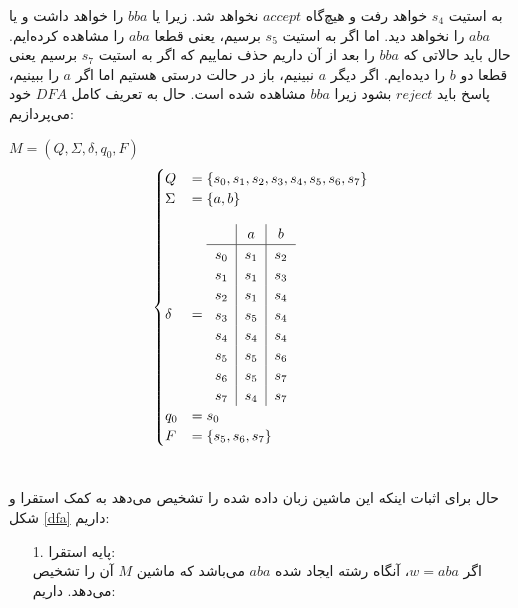 \begin{enumerate}
به استیت $s_4$ خواهد رفت و هیچ‌گاه $accept$ نخواهد شد.
زیرا یا $bba$ را خواهد داشت و یا $aba$ را نخواهد دید. اما اگر به استیت 
$s_5$ برسیم، یعنی قطعا 
$aba$ را مشاهده کرده‌ایم. حال باید حالاتی که $bba$ را بعد از آن داریم حذف نماییم که اگر به استیت $s_7$ برسیم یعنی قطعا دو $b$ را دیده‌ایم. اگر دیگر $a$ نبینیم، باز در حالت درستی هستیم اما اگر $a$ را ببینیم، پاسخ باید $reject$ بشود زیرا $bba$ مشاهده شده است.
حال به تعریف کامل $DFA$ خود می‌پردازیم:\\[0.1in]
\begin{center}
    $M = (Q, \Sigma, \delta, q_0, F)$
    \begin{equation*}
    \begin{cases}
        Q &= \{ s_0, s_1, s_2, s_3, s_4, s_5, s_6, s_7\} \\
        \Sigma &= \{ a, b\} \\[0.15in]
        \delta &=
        \begin{tabular}{c|c|c}
         & $a$ & $b$ \\ \hline
        $s_0$ & $s_1$ &$s_2$\\
        $s_1$ & $s_1$ &$s_3$\\
        $s_2$ & $s_1$ &$s_4$\\
        $s_3$ & $s_5$ &$s_4$\\
        $s_4$ & $s_4$ &$s_4$\\
        $s_5$ & $s_5$ &$s_6$\\
        $s_6$ & $s_5$ &$s_7$\\
        $s_7$ & $s_4$ &$s_7$\\
        \end{tabular}\\[0.1in]
        q_0 &= s_0\\
        F &= \{s_5, s_6, s_7\}\\
    \end{cases}
    \end{equation*}
    \\[0.3in]
\end{center}
حال برای اثبات اینکه این ماشین زبان داده شده را تشخیص می‌دهد به کمک استقرا و شکل \ref{dfa} داریم:\\[0.05in]
\begin{enumerate}
    \item[1.] پایه استقرا:\\[0.1in]
    اگر $w = aba$، آنگاه رشته ایجاد شده $aba$ می‌باشد که ماشین $M$ آن را تشخیص می‌دهد. داریم:\\[0.1in]
    \begin{center}

\end{center}
\end{enumerate}
\end{enumerate}
